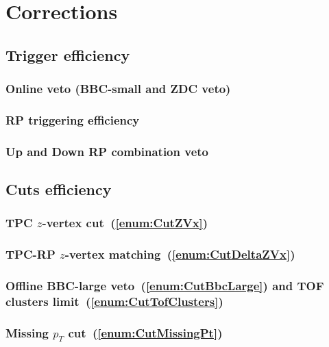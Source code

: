 

\chapter{Corrections}\label{chap:corrections}

\section{Trigger efficiency}\label{sec:triggerEff}
\subsection{Online veto (BBC-small and ZDC veto)}
\subsection{RP triggering efficiency}
\subsection{Up and Down RP combination veto}
\section{Cuts efficiency}\label{sec:cutsEff}
\subsection{TPC \texorpdfstring{$z$}{z}-vertex cut~(\ref{enum:CutZVx})}
\subsection{TPC-RP \texorpdfstring{$z$}{z}-vertex matching~(\ref{enum:CutDeltaZVx})}
\subsection{Offline BBC-large veto~(\ref{enum:CutBbcLarge}) and TOF clusters limit~(\ref{enum:CutTofClusters})}
\subsection{Missing \texorpdfstring{$p_{T}$}{pT} cut~(\ref{enum:CutMissingPt})}
